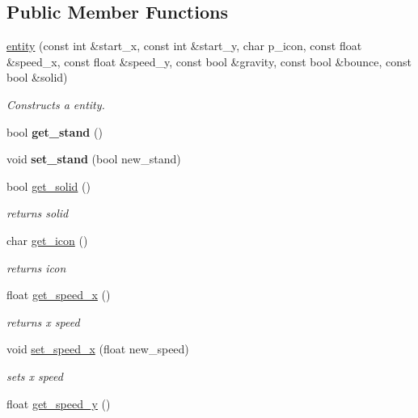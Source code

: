 \subsection*{Public Member Functions}
\begin{DoxyCompactItemize}
\item 
\hyperlink{classentity_aee3c44b079e4b0909636151b8394fd5b}{entity} (const int \&start\+\_\+x, const int \&start\+\_\+y, char p\+\_\+icon, const float \&speed\+\_\+x, const float \&speed\+\_\+y, const bool \&gravity, const bool \&bounce, const bool \&solid)
\begin{DoxyCompactList}\small\item\em Constructs a entity. \end{DoxyCompactList}\item 
\mbox{\label{classentity_ae4d78c5416cd69fbb391cda12a350bfa}} 
bool {\bfseries get\+\_\+stand} ()
\item 
\mbox{\label{classentity_a60593dd7d74e30a73422acd3fc4c7d30}} 
void {\bfseries set\+\_\+stand} (bool new\+\_\+stand)
\item 
bool \hyperlink{classentity_a3831f4f3b9a07d9fa412909ba2e8d2e7}{get\+\_\+solid} ()
\begin{DoxyCompactList}\small\item\em returns solid \end{DoxyCompactList}\item 
char \hyperlink{classentity_a7be4922bae8e57cb46947b752d6ee5b7}{get\+\_\+icon} ()
\begin{DoxyCompactList}\small\item\em returns icon \end{DoxyCompactList}\item 
float \hyperlink{classentity_a13d173e3d5dd4b669fc88180644b6ae4}{get\+\_\+speed\+\_\+x} ()
\begin{DoxyCompactList}\small\item\em returns x speed \end{DoxyCompactList}\item 
void \hyperlink{classentity_ab07ddec04048c0711a3684d49ae8fa91}{set\+\_\+speed\+\_\+x} (float new\+\_\+speed)
\begin{DoxyCompactList}\small\item\em sets x speed \end{DoxyCompactList}\item 
float \hyperlink{classentity_aac6ef6881c0a334a6cca1c321ffd6066}{get\+\_\+speed\+\_\+y} ()

\end{DoxyCompactItemize}

